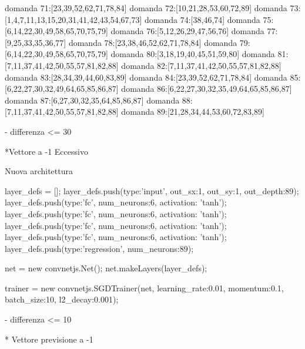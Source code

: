 domanda 71:[23,39,52,62,71,78,84]
domanda 72:[10,21,28,53,60,72,89]
domanda 73:[1,4,7,11,13,15,20,31,41,42,43,54,67,73]
domanda 74:[38,46,74]
domanda 75:[6,14,22,30,49,58,65,70,75,79]
domanda 76:[5,12,26,29,47,56,76]
domanda 77:[9,25,33,35,36,77]
domanda 78:[23,38,46,52,62,71,78,84]
domanda 79:[6,14,22,30,49,58,65,70,75,79]
domanda 80:[3,18,19,40,45,51,59,80]
domanda 81:[7,11,37,41,42,50,55,57,81,82,88]
domanda 82:[7,11,37,41,42,50,55,57,81,82,88]
domanda 83:[28,34,39,44,60,83,89]
domanda 84:[23,39,52,62,71,78,84]
domanda 85:[6,22,27,30,32,49,64,65,85,86,87]
domanda 86:[6,22,27,30,32,35,49,64,65,85,86,87]
domanda 87:[6,27,30,32,35,64,85,86,87]
domanda 88:[7,11,37,41,42,50,55,57,81,82,88]
domanda 89:[21,28,34,44,53,60,72,83,89]

- differenza <= 30

*Vettore a -1 Eccessivo


Nuova architettura

layer_defs = [];
layer_defs.push({type:'input', out_sx:1, out_sy:1, out_depth:89});
layer_defs.push({type:'fc', num_neurons:6, activation: 'tanh'});
layer_defs.push({type:'fc', num_neurons:6, activation: 'tanh'});
layer_defs.push({type:'fc', num_neurons:6, activation: 'tanh'});
layer_defs.push({type:'fc', num_neurons:6, activation: 'tanh'});
layer_defs.push({type:'regression', num_neurons:89});

net = new convnetjs.Net();
net.makeLayers(layer_defs);

trainer = new convnetjs.SGDTrainer(net, {learning_rate:0.01, momentum:0.1, batch_size:10, l2_decay:0.001});

- differenza <= 10

* Vettore previsione a -1

